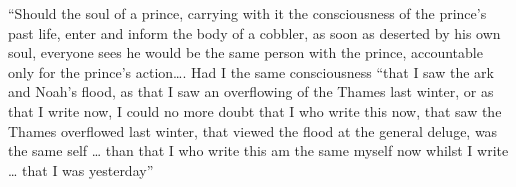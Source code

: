 \documentclass[]{article}
\begin{document}
``Should the soul of a prince, carrying with it the consciousness of the
prince's past life, enter and inform the body of a cobbler, as soon as
deserted by his own soul, everyone sees he would be the same person with
the prince, accountable only for the prince's action\ldots{}. Had I the
same consciousness ``that I saw the ark and Noah's flood, as that I saw
an overflowing of the Thames last winter, or as that I write now, I
could no more doubt that I who write this now, that saw the Thames
overflowed last winter, that viewed the flood at the general deluge, was
the same self \ldots{} than that I who write this am the same myself now
whilst I write \ldots{} that I was yesterday''
\end{document}
